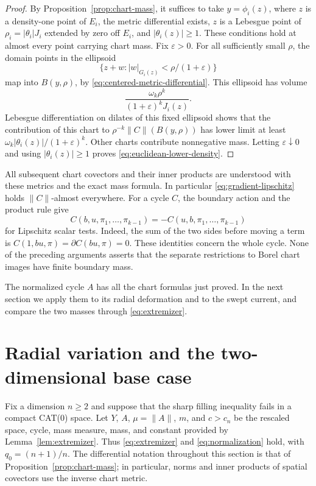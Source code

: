 \documentclass[11pt]{article}
\numberwithin{equation}{section}
\theoremstyle{definition}
\theoremstyle{remark}
\begin{document}
\begin{proof}
By Proposition~\ref{prop:chart-mass}, it suffices to take
\(y=\phi_i(z)\), where \(z\) is a density-one point of \(E_i\), the
metric differential exists, \(z\) is a Lebesgue point of
\(\rho_i=|\theta_i|J_i\) extended by zero off \(E_i\), and
\(|\theta_i(z)|\ge1\). These conditions hold at almost every point
carrying chart mass. Fix \(\varepsilon>0\). For all sufficiently small
\(\rho\), the domain points in the ellipsoid
\[
 \{z+w:|w|_{G_i(z)}<\rho/(1+\varepsilon)\}
\]
map into \(B(y,\rho)\), by
\eqref{eq:centered-metric-differential}. This ellipsoid has volume
\[
 \frac{\omega_k\rho^k}{(1+\varepsilon)^kJ_i(z)}.
\]
Lebesgue differentiation on dilates of this fixed ellipsoid shows that
the contribution of this chart to \(\rho^{-k}\|C\|(B(y,\rho))\) has
lower limit at least
\(\omega_k|\theta_i(z)|/(1+\varepsilon)^k\).
Other charts contribute nonnegative mass. Letting
\(\varepsilon\downarrow0\) and using \(|\theta_i(z)|\ge1\) proves
\eqref{eq:euclidean-lower-density}.
\end{proof}

All subsequent chart covectors and their inner products are understood
with these metrics and the exact mass formula. In particular
\eqref{eq:gradient-lipschitz} holds \(\|C\|\)-almost everywhere.
For a cycle \(C\), the boundary action and the product rule give
\begin{equation}
\label{eq:cycle-product-rule}
 C(b,u,\pi_1,\ldots,\pi_{k-1})
 =-C(u,b,\pi_1,\ldots,\pi_{k-1})
\end{equation}
for Lipschitz scalar tests. Indeed, the sum of the two sides before
moving a term is \(C(1,bu,\pi)=\partial C(bu,\pi)=0\).
These identities concern the whole cycle. None of the preceding
arguments asserts that the separate restrictions to Borel chart images
have finite boundary mass.


The normalized cycle $A$ has all the chart formulas just proved. In the
next section we apply them to its radial deformation and to the swept
current, and compare the two masses through \eqref{eq:extremizer}.

\section{Radial variation and the two-dimensional base case}
\label{sec:radial}

Fix a dimension $n\geq 2$ and suppose that the sharp filling inequality
fails in a compact CAT(0) space.  Let $Y$, $A$, $\mu=\|A\|$, $m$, and
$c>c_n$ be the rescaled space, cycle, mass measure, mass, and constant
provided by Lemma~\ref{lem:extremizer}.  Thus
\eqref{eq:extremizer} and \eqref{eq:normalization} hold, with
$q_0=(n+1)/n$.  The differential notation throughout this section is
that of Proposition~\ref{prop:chart-mass}; in particular, norms and inner
products of spatial covectors use the inverse chart metric.
\end{document}
